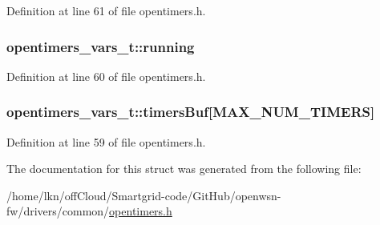 Definition at line 61 of file opentimers.\+h.

\subsubsection[{\texorpdfstring{running}{running}}]{ opentimers\+\_\+vars\+\_\+t\+::running}\hypertarget{structopentimers__vars__t_af471225bd8f9e96d7976c716438ca7c0}{}\label{structopentimers__vars__t_af471225bd8f9e96d7976c716438ca7c0}


Definition at line 60 of file opentimers.\+h.

\subsubsection[{\texorpdfstring{timers\+Buf}{timersBuf}}]{ opentimers\+\_\+vars\+\_\+t\+::timers\+Buf\mbox{[}{\bf M\+A\+X\+\_\+\+N\+U\+M\+\_\+\+T\+I\+M\+E\+RS}\mbox{]}}\hypertarget{structopentimers__vars__t_ad8b36924bdd25bdb1fe6f5b5ec255e83}{}\label{structopentimers__vars__t_ad8b36924bdd25bdb1fe6f5b5ec255e83}


Definition at line 59 of file opentimers.\+h.



The documentation for this struct was generated from the following file\+:\begin{DoxyCompactItemize}
\item 
/home/lkn/off\+Cloud/\+Smartgrid-\/code/\+Git\+Hub/openwsn-\/fw/drivers/common/\hyperlink{opentimers_8h}{opentimers.\+h}\end{DoxyCompactItemize}
